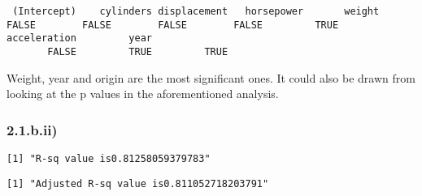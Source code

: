 \documentclass[
]{article}
\newenvironment{Shaded}{\begin{snugshade}}{\end{snugshade}}
\newcommand{\AttributeTok}[1]{\textcolor[rgb]{0.77,0.63,0.00}{#1}}
\newcommand{\FunctionTok}[1]{\textcolor[rgb]{0.00,0.00,0.00}{#1}}
\newcommand{\NormalTok}[1]{#1}
\newcommand{\OtherTok}[1]{\textcolor[rgb]{0.56,0.35,0.01}{#1}}
\newcommand{\SpecialCharTok}[1]{\textcolor[rgb]{0.00,0.00,0.00}{#1}}
\newcommand{\StringTok}[1]{\textcolor[rgb]{0.31,0.60,0.02}{#1}}
\begin{document}
\begin{verbatim}
 (Intercept)    cylinders displacement   horsepower       weight        FALSE        FALSE        FALSE        FALSE         TRUE 
acceleration         year 
       FALSE         TRUE         TRUE 
\end{verbatim}

Weight, year and origin are the most significant ones. It could also be
drawn from looking at the p values in the aforementioned analysis.

\hypertarget{b.ii}{%
\subsubsection{2.1.b.ii)}\label{b.ii}}

\begin{Shaded}
\end{Shaded}

\begin{verbatim}
[1] "R-sq value is0.81258059379783"
\end{verbatim}

\begin{Shaded}
\end{Shaded}

\begin{verbatim}
[1] "Adjusted R-sq value is0.811052718203791"
\end{verbatim}

\begin{Shaded}
\end{Shaded}
\end{document}
